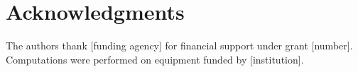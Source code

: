 \documentclass[12pt,a4paper]{article}
\begin{document}
\section*{Acknowledgments}
The authors thank [funding agency] for financial support under grant [number]. Computations were performed on equipment funded by [institution].




\newpage
\end{document}
